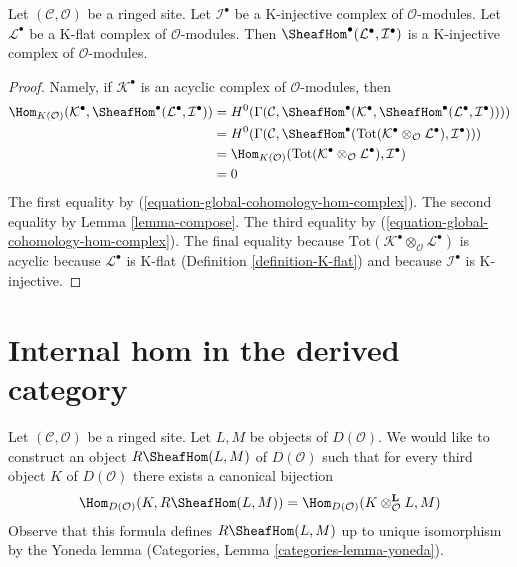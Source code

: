 \begin{lemma}
\label{lemma-RHom-from-K-flat-into-K-injective}
Let $(\mathcal{C}, \mathcal{O})$ be a ringed site. Let $\mathcal{I}^\bullet$
be a K-injective complex of $\mathcal{O}$-modules. Let
$\mathcal{L}^\bullet$ be a K-flat complex of $\mathcal{O}$-modules.
Then $\SheafHom^\bullet(\mathcal{L}^\bullet, \mathcal{I}^\bullet)$
is a K-injective complex of $\mathcal{O}$-modules.
\end{lemma}

\begin{proof}
Namely, if $\mathcal{K}^\bullet$ is an acyclic complex of
$\mathcal{O}$-modules, then
\begin{align*}
\Hom_{K(\mathcal{O})}(\mathcal{K}^\bullet,
\SheafHom^\bullet(\mathcal{L}^\bullet, \mathcal{I}^\bullet))
& =
H^0(\Gamma(\mathcal{C},
\SheafHom^\bullet(\mathcal{K}^\bullet,
\SheafHom^\bullet(\mathcal{L}^\bullet, \mathcal{I}^\bullet)))) \\
& =
H^0(\Gamma(\mathcal{C}, \SheafHom^\bullet(\text{Tot}(
\mathcal{K}^\bullet \otimes_\mathcal{O} \mathcal{L}^\bullet),
\mathcal{I}^\bullet))) \\
& =
\Hom_{K(\mathcal{O})}(
\text{Tot}(\mathcal{K}^\bullet \otimes_\mathcal{O} \mathcal{L}^\bullet),
\mathcal{I}^\bullet) \\
& =
0
\end{align*}
The first equality by (\ref{equation-global-cohomology-hom-complex}).
The second equality by Lemma \ref{lemma-compose}.
The third equality by (\ref{equation-global-cohomology-hom-complex}).
The final equality because
$\text{Tot}(\mathcal{K}^\bullet \otimes_\mathcal{O} \mathcal{L}^\bullet)$
is acyclic because $\mathcal{L}^\bullet$ is K-flat
(Definition \ref{definition-K-flat}) and because $\mathcal{I}^\bullet$
is K-injective.
\end{proof}








\section{Internal hom in the derived category}
\label{section-internal-hom}

\noindent
Let $(\mathcal{C}, \mathcal{O})$ be a ringed site. Let $L, M$ be objects
of $D(\mathcal{O})$. We would like to construct an object
$R\SheafHom(L, M)$ of $D(\mathcal{O})$ such that for every third
object $K$ of $D(\mathcal{O})$ there exists a canonical bijection
\begin{equation}
\label{equation-internal-hom}
\Hom_{D(\mathcal{O})}(K, R\SheafHom(L, M))
=
\Hom_{D(\mathcal{O})}(K \otimes_\mathcal{O}^\mathbf{L} L, M)
\end{equation}
Observe that this formula defines $R\SheafHom(L, M)$ up to unique
isomorphism by the Yoneda lemma
(Categories, Lemma \ref{categories-lemma-yoneda}).

